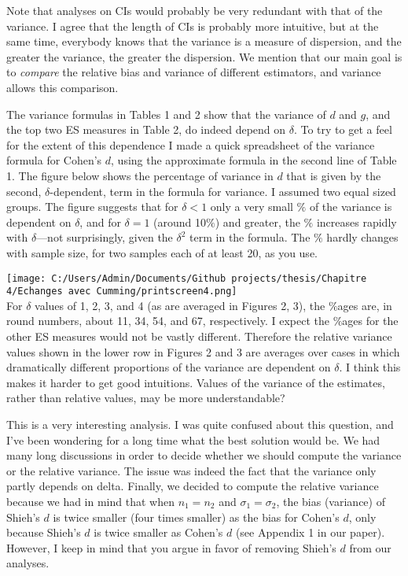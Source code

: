 \documentclass[
  12pt,
  french,
]{article}
\begin{document}
Note that analyses on CIs would probably be very redundant with that of
the variance. I agree that the length of CIs is probably more intuitive,
but at the same time, everybody knows that the variance is a measure of
dispersion, and the greater the variance, the greater the dispersion. We
mention that our main goal is to \emph{compare} the relative bias and
variance of different estimators, and variance allows this comparison.

\color{black} The variance formulas in Tables 1 and 2 show that the
variance of \(d\) and \(g\), and the top two ES measures in Table 2, do
indeed depend on \(\delta\). To try to get a feel for the extent of this
dependence I made a quick spreadsheet of the variance formula for
Cohen's \(d\), using the approximate formula in the second line of Table
1. The figure below shows the percentage of variance in \(d\) that is
given by the second, \(\delta\)-dependent, term in the formula for
variance. I assumed two equal sized groups. The figure suggests that for
\(\delta<1\) only a very small \(\%\) of the variance is dependent on
\(\delta\), and for \(\delta=1\) (around 10\(\%\)) and greater, the
\(\%\) increases rapidly with \(\delta\)---not surprisingly, given the
\(\delta^2\) term in the formula. The \(\%\) hardly changes with sample
size, for two samples each of at least 20, as you use.

\texttt{[image: C:/Users/Admin/Documents/Github projects/thesis/Chapitre 4/Echanges avec Cumming/printscreen4.png]}\\
For \(\delta\) values of 1, 2, 3, and 4 (as are averaged in Figures 2,
3), the \(\%\)ages are, in round numbers, about 11, 34, 54, and 67,
respectively. I expect the \(\%\)ages for the other ES measures would
not be vastly different. Therefore the relative variance values shown in
the lower row in Figures 2 and 3 are averages over cases in which
dramatically different proportions of the variance are dependent on
\(\delta\). I think this makes it harder to get good intuitions. Values
of the variance of the estimates, rather than relative values, may be
more understandable?

\color{blue} This is a very interesting analysis. I was quite confused
about this question, and I've been wondering for a long time what the
best solution would be. We had many long discussions in order to decide
whether we should compute the variance or the relative variance. The
issue was indeed the fact that the variance only partly depends on
delta. Finally, we decided to compute the relative variance because we
had in mind that when \(n_1=n_2\) and \(\sigma_1=\sigma_2\), the bias
(variance) of Shieh's \(d\) is twice smaller (four times smaller) as the
bias for Cohen's \(d\), only because Shieh's \(d\) is twice smaller as
Cohen's \(d\) (see Appendix 1 in our paper). However, I keep in mind
that you argue in favor of removing Shieh's \(d\) from our analyses.
\end{document}
